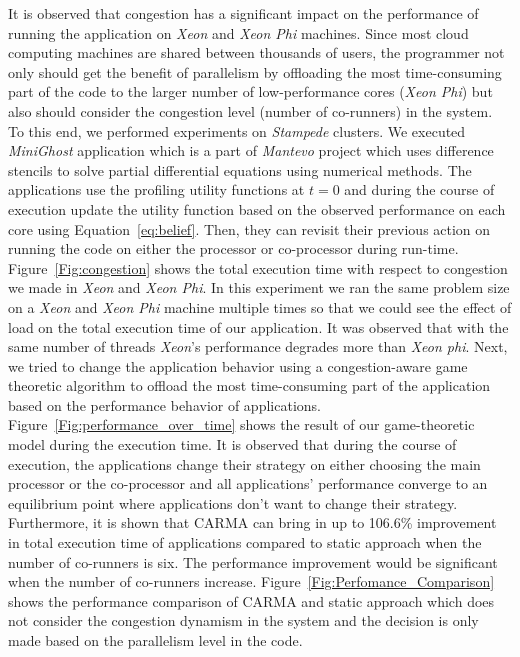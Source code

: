 It is observed that congestion has a significant impact on the performance of running the application on \textit{Xeon} and \textit{Xeon Phi} machines. Since most cloud computing machines are shared between thousands of users, the programmer not only should get the benefit of parallelism by offloading the most time-consuming part of the code to the larger number of low-performance cores (\textit{Xeon Phi}) but also should consider the congestion level (number of co-runners) in the system. To this end, we performed experiments on \textit{Stampede} clusters. We executed \textit{MiniGhost} application which is a part of \textit{Mantevo} project \cite{mantevo} which uses difference stencils to solve partial differential equations using numerical methods. The applications use the profiling utility functions at $t=0$ and during the course of execution update the utility function based on the observed performance on each core using Equation~\ref{eq:belief}. Then, they can revisit their previous action on running the code on either the processor or co-processor during run-time. \\
\indent Figure~\ref{Fig:congestion} shows the total execution time with respect to congestion we made in \textit{Xeon} and \textit{Xeon Phi}. In this experiment we ran the same problem size on a \textit{Xeon} and \textit{Xeon Phi} machine multiple times so that we could see the effect of load on the total execution time of our application. It was observed that with the same number of threads \textit{Xeon}'s performance degrades more than \textit{Xeon phi}. 
Next, we tried to change the application behavior using a congestion-aware game theoretic algorithm to offload the most time-consuming part of the application based on the performance behavior of applications. Figure~\ref{Fig:performance_over_time} shows the result of our game-theoretic model during the execution time. It is observed that during the course of execution, the applications change their strategy on either choosing the main processor or the co-processor and all applications' performance converge to an equilibrium point where applications don't want to change their strategy. \\
\indent Furthermore, it is shown that CARMA can bring in up to 106.6\% improvement in total execution time of applications compared to static approach when the number of co-runners is six. The performance improvement would be significant when the number of co-runners increase. Figure~\ref{Fig:Perfomance_Comparison} shows the performance comparison of CARMA and static approach which does not consider the congestion dynamism in the system and the decision is only made based on the parallelism level in the code. 
